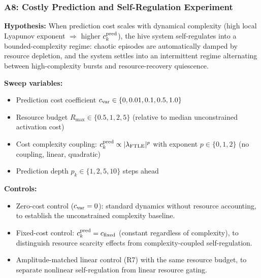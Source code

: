\subsubsection*{A8: Costly Prediction and Self-Regulation Experiment}

\textbf{Hypothesis:} When prediction cost scales with dynamical complexity
(high local Lyapunov exponent $\Rightarrow$ higher $c_k^{\rm pred}$), the hive
system self-regulates into a bounded-complexity regime: chaotic episodes are
automatically damped by resource depletion, and the system settles into an
intermittent regime alternating between high-complexity bursts and
resource-recovery quiescence.

\textbf{Sweep variables:}
\begin{itemize}
  \item Prediction cost coefficient $c_{\rm var}\in\{0,0.01,0.1,0.5,1.0\}$
  \item Resource budget $R_{\max}\in\{0.5,1,2,5\}$ (relative to median
        unconstrained activation cost)
  \item Cost complexity coupling: $c_k^{\rm pred}\propto |\lambda_{\rm FTLE}|^p$
        with exponent $p\in\{0,1,2\}$ (no coupling, linear, quadratic)
  \item Prediction depth $p_k\in\{1,2,5,10\}$ steps ahead
\end{itemize}

\textbf{Controls:}
\begin{itemize}
  \item Zero-cost control ($c_{\rm var}=0$): standard dynamics without
        resource accounting, to establish the unconstrained complexity baseline.
  \item Fixed-cost control: $c_k^{\rm pred}=c_{\rm fixed}$ (constant regardless
        of complexity), to distinguish resource scarcity effects from
        complexity-coupled self-regulation.
  \item Amplitude-matched linear control (R7) with the same resource budget,
        to separate nonlinear self-regulation from linear resource gating.
\end{itemize}

